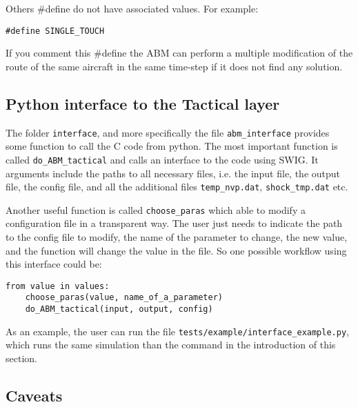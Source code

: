 \documentclass[12pt]{article}
\begin{document}
Others \#define do not have associated values. For example:
\begin{verbatim}
#define SINGLE_TOUCH
\end{verbatim}

If you comment this \#define the ABM can perform a multiple modification of the route of the same aircraft in the same time-step if it does not find any solution.

\subsection{Python interface to the Tactical layer}
\label{subsec:interface}

The folder \verb|interface|, and more specifically the file \verb|abm_interface| provides some function to call the C code from python. The most important function is called \verb|do_ABM_tactical| and calls an interface to the code using SWIG. It arguments include the paths to all necessary files, i.e. the input file, the output file, the config file, and all the additional files \verb|temp_nvp.dat|, \verb|shock_tmp.dat| etc.

Another useful function is called \verb|choose_paras| which able to modify a configuration file in a transparent way. The user just needs to indicate the path to the config file to modify, the name of the parameter to change, the new value, and the function will change the value in the file. So one possible workflow using this interface could be:

\begin{verbatim}
from value in values:
    choose_paras(value, name_of_a_parameter)
    do_ABM_tactical(input, output, config)
\end{verbatim} 

As an example, the user can run the file \verb|tests/example/interface_example.py|, which runs the same simulation than the command in the introduction of this section.

\subsection{Caveats}
\label{subsec:caveats}
\end{document}
